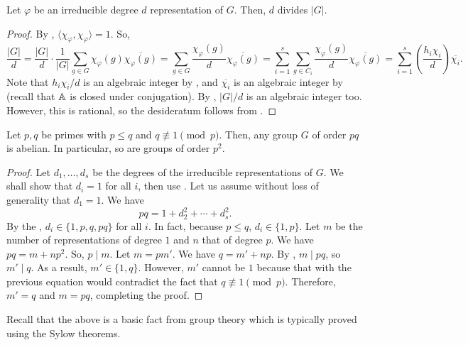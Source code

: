 		\begin{ftheo}
			\label{theo: dimension th}
			Let $\varphi$ be an irreducible degree $d$ representation of $G$. Then, $d$ divides $|G|$.
		\end{ftheo}
		\begin{proof}
			By , $\langle \chi_\varphi , \chi_\varphi \rangle = 1$. So,
			\[ \frac{|G|}{d} = \frac{|G|}{d} \cdot \frac{1}{|G|} \sum_{g \in G} \chi_\varphi(g) \overline{\chi_\varphi(g)} = \sum_{g \in G} \frac{\chi_\varphi(g)}{d} \overline{\chi_\varphi(g)} = \sum_{i=1}^s \sum_{g \in C_i} \frac{\chi_\varphi(g)}{d} \overline{\chi_\varphi(g)} = \sum_{i=1}^s \left( \frac{h_i\chi_i}{d} \right) \overline{\chi_i}. \]
			Note that $h_i \chi_i / d$ is an algebraic integer by , and $\overline{\chi_i}$ is an algebraic integer by  (recall that $\mathbb{A}$ is closed under conjugation). By , $|G|/d$ is an algebraic integer too. However, this is rational, so the desideratum follows from .
		\end{proof}

		\begin{fcor}
			Let $p,q$ be primes with $p \le q$ and $q \not\equiv 1 \pmod p$. Then, any group $G$ of order $pq$ is abelian. In particular, so are groups of order $p^2$.
		\end{fcor}
		\begin{proof}
			Let $d_1,\ldots,d_s$ be the degrees of the irreducible representations of $G$. We shall show that $d_i = 1$ for all $i$, then use . Let us assume without loss of generality that $d_1 = 1$. We have
			\[ pq = 1 + d_2^2 + \cdots + d_s^2. \]
			By the , $d_i \in \{1,p,q,pq\}$ for all $i$. In fact, because $p \le q$, $d_i \in \{1,p\}$. Let $m$ be the number of representations of degree $1$ and $n$ that of degree $p$. We have $pq = m + np^2$. So, $p \mid m$. Let $m = pm'$. We have $q = m' + np$. By , $m \mid pq$, so $m' \mid q$. As a result, $m'\in\{1,q\}$. However, $m'$ cannot be $1$ because that with the previous equation would contradict the fact that $q \not\equiv 1 \pmod p$. Therefore, $m' = q$ and $m = pq$, completing the proof.
		\end{proof}

		Recall that the above is a basic fact from group theory which is typically proved using the Sylow theorems.

